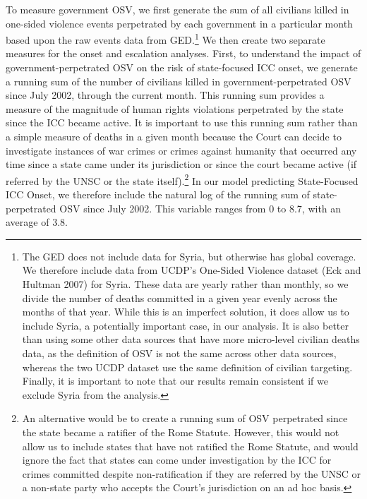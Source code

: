 To measure government OSV, we first generate the sum of all civilians killed in one-sided violence events perpetrated by each government in a particular month based upon the raw events data from GED.\footnote{The GED does not include data for Syria, but otherwise has global coverage.  We therefore include data from UCDP’s One-Sided Violence dataset (Eck and Hultman 2007) for Syria.  These data are yearly rather than monthly, so we divide the number of deaths committed in a given year evenly across the months of that year.  While this is an imperfect solution, it does allow us to include Syria, a potentially important case, in our analysis.  It is also better than using some other data sources that have more micro-level civilian deaths data, as the definition of OSV is not the same across other data sources, whereas the two UCDP dataset use the same definition of civilian targeting.  Finally, it is important to note that our results remain consistent if we exclude Syria from the analysis.} We then create two separate measures for the onset and escalation analyses.  First, to understand the impact of government-perpetrated OSV on the risk of state-focused ICC onset, we generate a running sum of the number of civilians killed in government-perpetrated OSV since July 2002, through the current month.  This running sum provides a measure of the magnitude of human rights violations perpetrated by the state since the ICC became active.  It is important to use this running sum rather than a simple measure of deaths in a given month because the Court can decide to investigate instances of war crimes or crimes against humanity that occurred any time since a state came under its jurisdiction or since the court became active (if referred by the UNSC or the state itself).\footnote{An alternative would be to create a running sum of OSV perpetrated since the state became a ratifier of the Rome Statute.  However, this would not allow us to include states that have not ratified the Rome Statute, and would ignore the fact that states can come under investigation by the ICC for crimes committed despite non-ratification if they are referred by the UNSC or a non-state party who accepts the Court’s jurisdiction on an ad hoc basis.} In our model predicting State-Focused ICC Onset, we therefore include the natural log of the running sum of state-perpetrated OSV since July 2002.  This variable ranges from 0 to 8.7, with an average of 3.8.  

